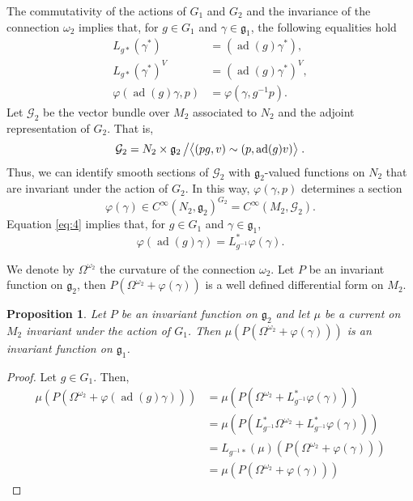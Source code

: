 \documentclass[10pt,twoside]{article}
\numberwithin{equation}{section}
\theoremstyle{plain}
\newtheorem{proposition}[equation]{Proposition}
\theoremstyle{definition}
\DeclareMathOperator{\ad}{ad}
\begin{document}
The commutativity of the actions of $G_{1}$ and $G_{2}$ and the
invariance of the connection $\omega_{2} $ implies that, for $g\in
G_{1}$ and $\gamma \in \mathfrak{g}_{1}$, the
following equalities hold 
\begin{align}
  L_{g\ast} (\gamma ^{\ast})&= (\ad (g)\gamma ^{\ast}),\\
  L_{g\ast} (\gamma ^{\ast})^{V}&= (\ad (g)\gamma ^{\ast})^{V},\\
  \varphi(\ad(g)\gamma ,p)&=\varphi(\gamma ,g^{-1}p).\label{eq:4}
\end{align}
Let $\mathcal{G}_{2}$ be the vector bundle over $M_{2}$ associated to $N_{2}$
and the adjoint representation of $G_{2}$. That is,
$$\mathcal{G}_{2}=N_{2}\times \mathfrak{g}_{2}\left/\big\langle (pg,v)\sim
(p,\ad(g)v)\big\rangle\right. . $$ Thus, we
can identify smooth sections of $\mathcal{G}_{2}$ with  $
\mathfrak{g}_{2}$-valued functions on $N_{2}$ that are invariant
under the action of $G_{2}$. In this way, 
$\varphi(\gamma ,p)$ determines a section  
\begin{displaymath}
 \varphi(\gamma )\in C^{\infty}(N_{2},\mathfrak{g}_{2})^{G_{2}}=
 C^{\infty}(M_{2},\mathcal{G}_{2}).
\end{displaymath}
Equation \eqref{eq:4} implies that, for $g\in
G_{1}$ and $\gamma \in \mathfrak{g}_{1}$,
\begin{displaymath}
  \varphi(\ad(g)\gamma )=L_{g^{-1}}^{\ast}\varphi(\gamma ).
\end{displaymath}

We denote by $\Omega ^{\omega_{2} }$ the curvature of the connection
$\omega_{2} $. Let $P$ be an invariant function on $\mathfrak{g}_{2}$,
then $P(\Omega ^{\omega_{2}
}+\varphi(\gamma))$ is a well defined differential form on $M_{2}$.   


\begin{proposition} \label{prop:2}
  Let $P$ be an invariant function on $\mathfrak{g}_{2}$ and let $\mu
  $ be a current on $M_{2}$ invariant under the action of $G_{1}$. 
  Then $\mu (P(\Omega ^{\omega_{2}
}+\varphi(\gamma)))$ is an invariant function on
$\mathfrak{g}_{1}$. 
\end{proposition}
\begin{proof}
  Let $g\in G_{1}$. Then,  
  \begin{align*}
    \mu (P(\Omega ^{\omega_{2}
    }+\varphi(\ad(g) \gamma)))&=
    \mu (P(\Omega ^{\omega_{2}
    }+L_{g^{-1}}^{\ast} \varphi(\gamma)))\\
    &=\mu (P(L_{g^{-1}}^{\ast}\Omega ^{\omega_{2}
    }+L_{g^{-1}}^{\ast} \varphi(\gamma)))\\
    &=L_{g^{-1}\ast}(\mu)(P(\Omega ^{\omega_{2}
    }+\varphi( \gamma)))\\ 
    &= \mu (P(\Omega ^{\omega_{2}
    }+\varphi( \gamma)))
  \end{align*}
\end{proof}
\end{document}
